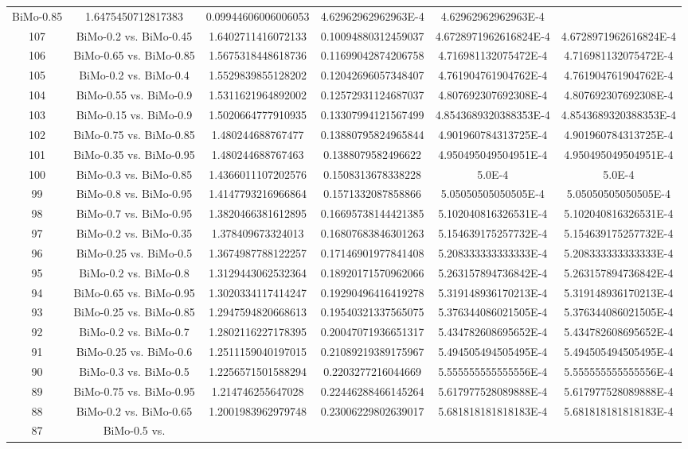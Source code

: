 \documentclass[a4paper,10pt]{article}
\begin{document}
\begin{landscape}
\begin{table}[!htp]
\begin{tabular}{cccccc}
BiMo-0.85&1.6475450712817383&0.09944606006006053&4.62962962962963E-4&4.62962962962963E-4\\107&BiMo-0.2 vs. BiMo-0.45&1.6402711416072133&0.10094880312459037&4.6728971962616824E-4&4.6728971962616824E-4\\106&BiMo-0.65 vs. BiMo-0.85&1.5675318448618736&0.11699042874206758&4.716981132075472E-4&4.716981132075472E-4\\105&BiMo-0.2 vs. BiMo-0.4&1.5529839855128202&0.12042696057348407&4.761904761904762E-4&4.761904761904762E-4\\104&BiMo-0.55 vs. BiMo-0.9&1.5311621964892002&0.12572931124687037&4.807692307692308E-4&4.807692307692308E-4\\103&BiMo-0.15 vs. BiMo-0.9&1.5020664777910935&0.13307994121567499&4.8543689320388353E-4&4.8543689320388353E-4\\102&BiMo-0.75 vs. BiMo-0.85&1.480244688767477&0.13880795824965844&4.901960784313725E-4&4.901960784313725E-4\\101&BiMo-0.35 vs. BiMo-0.95&1.480244688767463&0.1388079582496622&4.950495049504951E-4&4.950495049504951E-4\\100&BiMo-0.3 vs. BiMo-0.85&1.4366011107202576&0.1508313678338228&5.0E-4&5.0E-4\\99&BiMo-0.8 vs. BiMo-0.95&1.4147793216966864&0.1571332087858866&5.05050505050505E-4&5.05050505050505E-4\\98&BiMo-0.7 vs. BiMo-0.95&1.3820466381612895&0.16695738144421385&5.102040816326531E-4&5.102040816326531E-4\\97&BiMo-0.2 vs. BiMo-0.35&1.378409673324013&0.16807683846301263&5.154639175257732E-4&5.154639175257732E-4\\96&BiMo-0.25 vs. BiMo-0.5&1.3674987788122257&0.17146901977841408&5.208333333333333E-4&5.208333333333333E-4\\95&BiMo-0.2 vs. BiMo-0.8&1.3129443062532364&0.18920171570962066&5.263157894736842E-4&5.263157894736842E-4\\94&BiMo-0.65 vs. BiMo-0.95&1.3020334117414247&0.19290496416419278&5.319148936170213E-4&5.319148936170213E-4\\93&BiMo-0.25 vs. BiMo-0.85&1.2947594820668613&0.19540321337565075&5.376344086021505E-4&5.376344086021505E-4\\92&BiMo-0.2 vs. BiMo-0.7&1.2802116227178395&0.20047071936651317&5.434782608695652E-4&5.434782608695652E-4\\91&BiMo-0.25 vs. BiMo-0.6&1.2511159040197015&0.21089219389175967&5.494505494505495E-4&5.494505494505495E-4\\90&BiMo-0.3 vs. BiMo-0.5&1.2256571501588294&0.2203277216044669&5.555555555555556E-4&5.555555555555556E-4\\89&BiMo-0.75 vs. BiMo-0.95&1.214746255647028&0.22446288466145264&5.617977528089888E-4&5.617977528089888E-4\\88&BiMo-0.2 vs. BiMo-0.65&1.2001983962979748&0.23006229802639017&5.681818181818183E-4&5.681818181818183E-4\\87&BiMo-0.5 vs. 
\end{tabular}
\end{table}
\end{landscape}
\end{document}
